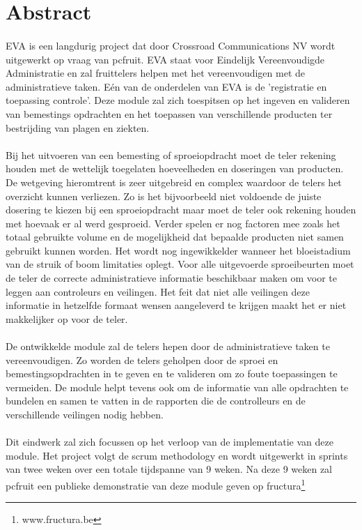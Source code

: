 \section* {Abstract}

\paragraph{}EVA is een langdurig project dat door Crossroad Communications NV wordt uitgewerkt op vraag van pcfruit. EVA staat voor Eindelijk Vereenvoudigde Administratie en zal fruittelers helpen met het vereenvoudigen met de administratieve taken. Eén van de onderdelen van EVA is de 'registratie en toepassing controle'. Deze module zal zich toespitsen op het ingeven en valideren van bemestings opdrachten en het toepassen van verschillende producten ter bestrijding van plagen en ziekten.
\paragraph{}Bij het uitvoeren van een bemesting of sproeiopdracht moet de teler rekening houden met de wettelijk toegelaten hoeveelheden en doseringen van producten. De wetgeving hieromtrent is zeer uitgebreid en complex waardoor de telers het overzicht kunnen verliezen. Zo is het bijvoorbeeld niet voldoende de juiste dosering te kiezen bij een sproeiopdracht maar moet de teler ook rekening houden met hoevaak er al werd gesproeid. Verder spelen er nog factoren mee zoals het totaal gebruikte volume en de mogelijkheid dat bepaalde producten niet samen gebruikt kunnen worden. Het wordt nog ingewikkelder wanneer het bloeistadium van de struik of boom limitaties oplegt. Voor alle uitgevoerde sproeibeurten moet de teler de correcte administratieve informatie beschikbaar maken om voor te leggen aan controleurs en veilingen. Het feit dat niet alle veilingen deze informatie in hetzelfde formaat wensen aangeleverd te krijgen maakt het er niet makkelijker op voor de teler.
\paragraph{}De ontwikkelde module zal de telers hepen door de administratieve taken te vereenvoudigen. Zo worden de telers geholpen door de sproei en bemestingsopdrachten in te geven en te valideren om zo foute toepassingen te vermeiden. De module helpt tevens ook om de informatie van alle opdrachten te bundelen en samen te vatten in de rapporten die de controlleurs en de verschillende veilingen nodig hebben.
\paragraph{}Dit eindwerk zal zich focussen op het verloop van de implementatie van deze module. Het project volgt de scrum methodology en wordt uitgewerkt in sprints van twee weken over een totale tijdspanne van 9 weken. Na deze 9 weken zal pcfruit een publieke demonstratie van deze module geven op fructura\footnote{www.fructura.be}
